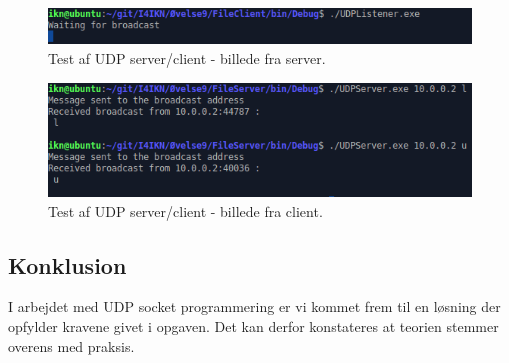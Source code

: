 \begin{figure}[H]
	\centering
	\includegraphics[width=0.9\linewidth]{figs/udp_h1}
	\caption{Test af UDP server/client - billede fra server.}
	\label{fig:udp_h1}
\end{figure}

\begin{figure}[H]
	\centering
	\includegraphics[width=0.9\linewidth]{figs/udp_h2}
	\caption{Test af UDP server/client - billede fra client.}
	\label{fig:udp_h2}
\end{figure}

\subsection{Konklusion}
I arbejdet med UDP socket programmering er vi kommet frem til en løsning der opfylder kravene givet i opgaven. Det kan derfor konstateres at teorien stemmer overens med praksis.